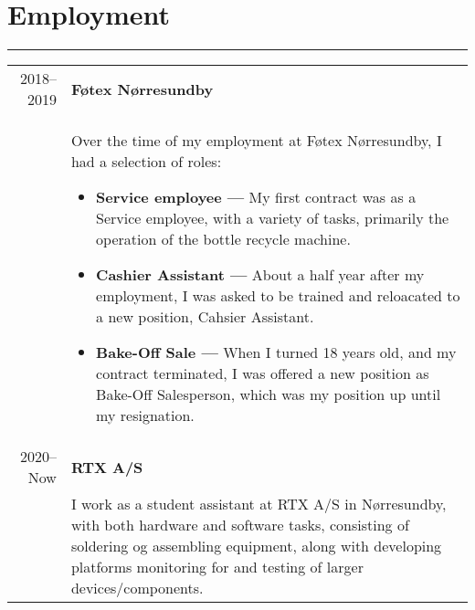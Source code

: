 \documentclass{article}
\begin{document}
\section*{Employment}
\hrule width5cm
\begin{longtabu} to \textwidth {r|X}
2018--2019 & \textbf{Føtex Nørresundby}\\
&   Over the time of my employment at Føtex Nørresundby, I had a selection of roles:
        \begin{itemize}\setlength\itemsep{0em}
            \item[] \textbf{Service employee --- } My first contract was as a Service employee,
                with a variety of tasks, primarily the operation of the bottle recycle machine.
            \item[] \textbf{Cashier Assistant --- } About a half year after my employment,
                I was asked to be trained and reloacated to a new position, Cahsier Assistant.
            \item[] \textbf{Bake-Off Sale --- } When I turned 18 years old, and my contract
                terminated, I was offered a new position as Bake-Off Salesperson, which was my
                position up until my resignation.
        \end{itemize} \\
    2020--Now & \textbf{RTX A/S}\\
    &   I work as a student assistant at RTX A/S in Nørresundby, with both hardware and software tasks,
        consisting of soldering og assembling equipment, along with developing platforms monitoring for and testing of larger devices/components.
\end{longtabu}
\end{document}
